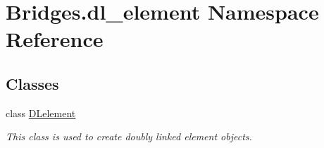 \hypertarget{namespace_bridges_1_1dl__element}{}\section{Bridges.\+dl\+\_\+element Namespace Reference}
\label{namespace_bridges_1_1dl__element}
\subsection*{Classes}
\begin{DoxyCompactItemize}
\item 
class \mbox{\hyperlink{class_bridges_1_1dl__element_1_1_d_lelement}{D\+Lelement}}
\begin{DoxyCompactList}\small\item\em This class is used to create doubly linked element objects. \end{DoxyCompactList}\end{DoxyCompactItemize}
